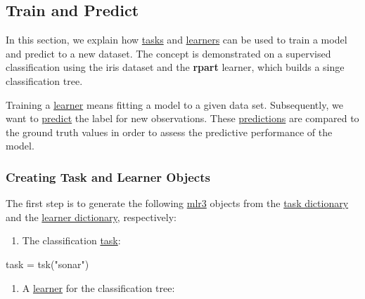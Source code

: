 \documentclass[]{article}
\newenvironment{Shaded}{}{}
\newcommand{\KeywordTok}[1]{\textcolor[rgb]{0.00,0.00,1.00}{#1}}
\newcommand{\NormalTok}[1]{#1}
\newcommand{\StringTok}[1]{\textcolor[rgb]{0.00,0.50,0.50}{#1}}
\providecommand{\tightlist}{%
  \setlength{\itemsep}{0pt}\setlength{\parskip}{0pt}}
\renewenvironment{Shaded} {\begin{snugshade}\small} {\end{snugshade}}
\begin{document}
\hypertarget{train-predict}{%
\subsection{Train and Predict}\label{train-predict}}

In this section, we explain how \protect\hyperlink{tasks}{tasks} and \protect\hyperlink{learners}{learners} can be used to train a model and predict to a new dataset.
The concept is demonstrated on a supervised classification using the iris dataset and the \textbf{rpart} learner, which builds a singe classification tree.

Training a \protect\hyperlink{learners}{learner} means fitting a model to a given data set.
Subsequently, we want to \protect\hyperlink{predicting}{predict} the label for new observations.
These \protect\hyperlink{predicting}{predictions} are compared to the ground truth values in order to assess the predictive performance of the model.

\hypertarget{train-predict-objects}{%
\subsubsection{Creating Task and Learner Objects}\label{train-predict-objects}}

The first step is to generate the following \href{https://mlr3.mlr-org.com}{mlr3} objects from the \protect\hyperlink{tasks}{task dictionary} and the \protect\hyperlink{learners}{learner dictionary}, respectively:

\begin{enumerate}
\def\labelenumi{\arabic{enumi}.}
\tightlist
\item
  The classification \protect\hyperlink{tasks}{task}:
\end{enumerate}

\begin{Shaded}
\begin{Highlighting}[]
\NormalTok{task =}\StringTok{ }\KeywordTok{tsk}\NormalTok{(}\StringTok{"sonar"}\NormalTok{)}
\end{Highlighting}
\end{Shaded}

\begin{enumerate}
\def\labelenumi{\arabic{enumi}.}
\setcounter{enumi}{1}
\tightlist
\item
  A \protect\hyperlink{learners}{learner} for the classification tree:
\end{enumerate}
\end{document}
